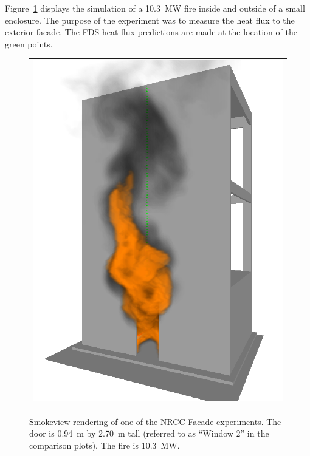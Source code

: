 Figure~\ref{NRCC_Facade_Image} displays the simulation of a 10.3~MW fire inside and outside of a small
enclosure. The purpose of the experiment was to measure the heat flux to the exterior facade. The
FDS heat flux predictions are made at the location of the green points.

\begin{figure}[h!]
\begin{center}
\begin{tabular}{c}
\includegraphics[width=5.0in]{FIGURES/NRCC_Facade/NRCC_Facade_Win_2_10_MW_0467}
\end{tabular}
\end{center}
\caption[Smokeview rendering of NRCC Facade experiment.]
{Smokeview rendering of one of the NRCC Facade experiments. The door is
0.94~m by 2.70~m tall (referred to as ``Window 2'' in the comparison plots). The
fire is 10.3~MW.}
\label{NRCC_Facade_Image}
\end{figure}


